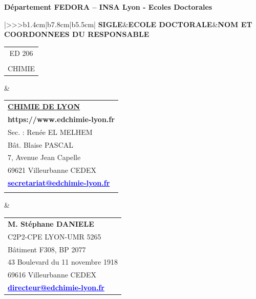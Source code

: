 \endgroup


\pagestyle{empty}

\begin{center}
\large\textbf{Département FEDORA – INSA Lyon - Ecoles Doctorales}
\end{center}

\fontsize{7.0pt}{7.0pt}\selectfont
\begin{center}%
\begin{tabular}{|>{\centering}>{}>{\color{txtED}}b{1.4cm}|b{7.8cm}|b{5.5cm}|}
\hline\vspace{.05cm}
\textbf{SIGLE}&\textbf{ECOLE DOCTORALE}&\textbf{NOM ET COORDONNEES DU RESPONSABLE}\\

\hline	
	\begin{tabular}{@{}c@{}}
		ED 206\\
		\\
		CHIMIE\end{tabular}&
	\begin{tabular}{@{}l@{}}
		\\
		\textbf{\underline{CHIMIE DE LYON}}\\[.2cm]
		\textcolor{siteED}{\textbf{https://www.edchimie-lyon.fr}}\\
		Sec. : Renée EL MELHEM\\
		Bât. Blaise PASCAL\\
		7, Avenue Jean Capelle\\
		69621 Villeurbanne CEDEX\\
		\textcolor{blue}{\underline{\textbf{secretariat@edchimie-lyon.fr}}}\\
		\\
	\end{tabular}&
	\begin{tabular}{@{}l@{}}
		\textcolor{txtED}{\textbf{M. Stéphane DANIELE}}\\
		C2P2-CPE LYON-UMR 5265\\
		Bâtiment F308, BP 2077\\
		43 Boulevard du 11 novembre 1918\\
		69616 Villeurbanne CEDEX\\
		\textcolor{blue}{\underline{\textbf{directeur@edchimie-lyon.fr}}}\\
	\end{tabular}\\
	

\end{tabular}
\end{center}
